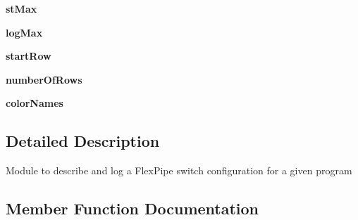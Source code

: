 \begin{DoxyCompactItemize}
\item 
\hypertarget{classmapper_1_1src_1_1flexpipe_1_1flexpipe__configuration_1_1_flexpipe_configuration_a2b8227101fd01848931a568ad5efc158}{}{\bfseries st\+Max}\label{classmapper_1_1src_1_1flexpipe_1_1flexpipe__configuration_1_1_flexpipe_configuration_a2b8227101fd01848931a568ad5efc158}

\item 
\hypertarget{classmapper_1_1src_1_1flexpipe_1_1flexpipe__configuration_1_1_flexpipe_configuration_a278200d3867af8d8fc8c0cb6bf453ba4}{}{\bfseries log\+Max}\label{classmapper_1_1src_1_1flexpipe_1_1flexpipe__configuration_1_1_flexpipe_configuration_a278200d3867af8d8fc8c0cb6bf453ba4}

\item 
\hypertarget{classmapper_1_1src_1_1flexpipe_1_1flexpipe__configuration_1_1_flexpipe_configuration_aaa6ad95be7de2883f8ea99aae6d32652}{}{\bfseries start\+Row}\label{classmapper_1_1src_1_1flexpipe_1_1flexpipe__configuration_1_1_flexpipe_configuration_aaa6ad95be7de2883f8ea99aae6d32652}

\item 
\hypertarget{classmapper_1_1src_1_1flexpipe_1_1flexpipe__configuration_1_1_flexpipe_configuration_a8eedd555cf60e861037add1d3c40a146}{}{\bfseries number\+Of\+Rows}\label{classmapper_1_1src_1_1flexpipe_1_1flexpipe__configuration_1_1_flexpipe_configuration_a8eedd555cf60e861037add1d3c40a146}

\item 
\hypertarget{classmapper_1_1src_1_1flexpipe_1_1flexpipe__configuration_1_1_flexpipe_configuration_a3d3f96fa7bdda1fb05e13f03dce5c5d2}{}{\bfseries color\+Names}\label{classmapper_1_1src_1_1flexpipe_1_1flexpipe__configuration_1_1_flexpipe_configuration_a3d3f96fa7bdda1fb05e13f03dce5c5d2}

\end{DoxyCompactItemize}


\subsection{Detailed Description}
\begin{DoxyVerb}Module to describe and log a FlexPipe switch configuration
for a given program
\end{DoxyVerb}
 

\subsection{Member Function Documentation}
\hypertarget{classmapper_1_1src_1_1flexpipe_1_1flexpipe__configuration_1_1_flexpipe_configuration_a7a42a167b54bbcf85f1c26ead6593d11}{}

